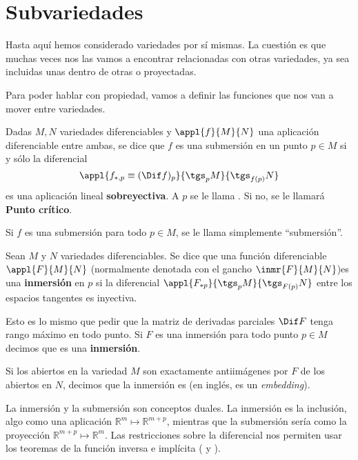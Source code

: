 
\section{Subvariedades}

Hasta aquí hemos considerado variedades por sí mismas. La cuestión es que muchas veces nos las vamos a encontrar relacionadas con otras variedades, ya sea incluidas unas dentro de otras o proyectadas.

Para poder hablar con propiedad, vamos a definir las funciones que nos van a mover entre variedades.

\begin{defn}[Submersión] Dadas $M,N$ variedades diferenciables y $\appl{f}{M}{N}$ una aplicación diferenciable entre ambas, se dice que $f$ es una submersión en un punto $p ∈ M$ si y sólo la diferencial \[ \appl{f_{*,p} \equiv (\Dif f)_p}{\tgs_p M}{\tgs_{f(p)}N} \] es una aplicación lineal \textbf{sobreyectiva}. A $p$ se le llama . Si no, se le llamará \textbf{Punto crítico}.

Si $f$ es una submersión para todo $p∈M$, se le llama simplemente ``submersión''.
\end{defn}

\begin{defn}[Inmersión]\label{def:Inmersion} Sean $M$ y $N$ variedades diferenciables. Se dice que una función diferenciable $\appl{F}{M}{N}$ (normalmente denotada con el gancho $\inmr{F}{M}{N}$)es una \textbf{inmersión} en $p$ si la diferencial $\appl{F_{*p}}{\tgs_pM}{\tgs_{F(p)}N}$ entre los espacios tangentes es inyectiva.

Esto es lo mismo que pedir que la matriz de derivadas parciales $\Dif F$ tenga rango máximo en todo punto. Si $F$ es una inmersión para todo punto $p\in M$ decimos que es una \textbf{inmersión}.

Si los abiertos en la variedad $M$ son exactamente antiimágenes por $F$ de los abiertos en $N$, decimos que la inmersión es  (en inglés, es un \textit{embedding}).
\end{defn}

La inmersión y la submersión son conceptos duales. La inmersión es la inclusión, algo como una aplicación $ℝ^m \longmapsto ℝ^{m+p}$, mientras que la submersión sería como la proyección $ℝ^{m+p} \longmapsto ℝ^m$. Las restricciones sobre la diferencial nos permiten usar los teoremas de la función inversa e implícita ( y ).

